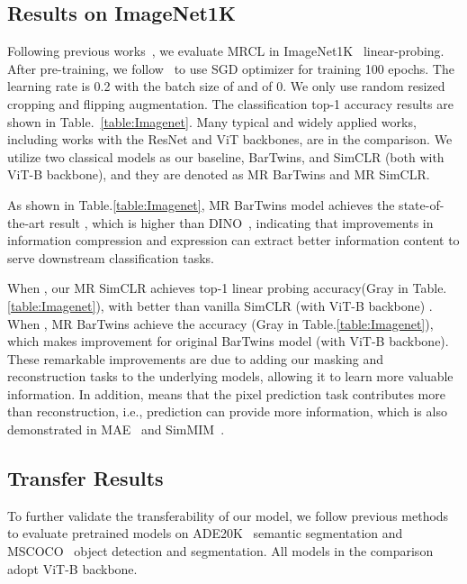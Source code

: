 \documentclass[10pt,twocolumn,letterpaper]{article}
\begin{document}
\subsection{Results on ImageNet1K}
Following previous works~\cite{caron2021emerging,chen2021empirical,chen2020simple,bao2021beit}, we evaluate MRCL in ImageNet1K~\cite{li2021image} linear-probing. After pre-training, we follow~\cite{chen2021empirical} to use SGD optimizer for training 100 epochs. The learning rate is 0.2 with the batch size of  and  of 0. We only use random resized cropping and flipping augmentation. The classification top-1 accuracy results are shown in Table.~\ref{table:Imagenet}. Many typical and widely applied works, including works with the ResNet and ViT backbones, are in the comparison. We utilize two classical models as our baseline, BarTwins, and SimCLR (both with ViT-B backbone), and they are denoted as MR BarTwins and MR SimCLR.

As shown in Table.\ref{table:Imagenet}, MR BarTwins model achieves the state-of-the-art result , which is  higher than DINO~\cite{caron2021emerging}, indicating that improvements in information compression and expression can extract better information content to serve downstream classification tasks.

When , our MR SimCLR achieves  top-1 linear probing accuracy(\colorbox{gray!20}{Gray} in Table.\ref{table:Imagenet}), with  better than vanilla SimCLR (with ViT-B backbone) . When , MR BarTwins achieve the  accuracy (\colorbox{gray!20}{Gray} in Table.\ref{table:Imagenet}), which makes  improvement for original BarTwins model (with ViT-B backbone). These remarkable improvements are due to adding our masking and reconstruction tasks to the underlying models, allowing it to learn more valuable information. In addition,  means that the pixel prediction task contributes more than reconstruction, i.e., prediction can provide more information, which is also demonstrated in MAE~\cite{he2022masked} and SimMIM~\cite{xie2022simmim}.



\subsection{Transfer Results}
To further validate the transferability of our model, we follow previous methods to evaluate pretrained models on ADE20K~\cite{zhou2019semantic} semantic segmentation and MSCOCO~\cite{lin2014microsoft} object detection and segmentation. All models in the comparison adopt ViT-B backbone.
\end{document}
